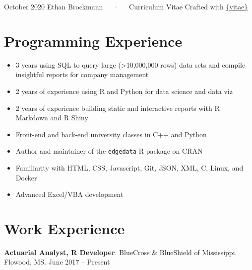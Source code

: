 \documentclass[11pt, a4paper]{awesome-cv}
\begin{document}
\makecvheader

\makecvfooter
  {October 2020}
    {Ethan Brockmann~~~·~~~Curriculum Vitae}
  {Crafted with \href{https://github.com/mitchelloharawild/vitae}{\{vitae\}}}




\hypertarget{programming-experience}{%
\section{Programming Experience}\label{programming-experience}}

\begin{itemize}
\item
  3 years using SQL to query large (\textgreater10,000,000 rows) data sets and compile insightful reports for company management
\item
  2 years of experience using R and Python for data science and data viz
\item
  2 years of experience building static and interactive reports with R Markdown and R Shiny
\item
  Front-end and back-end university classes in C++ and Python
\item
  Author and maintainer of the \texttt{edgedata} R package on CRAN
\item
  Familiarity with HTML, CSS, Javascript, Git, JSON, XML, C, Linux, and Docker
\item
  Advanced Excel/VBA development
\end{itemize}

\hypertarget{work-experience}{%
\section{Work Experience}\label{work-experience}}

\textbf{Actuarial Analyst, R Developer}. BlueCross \& BlueShield of Mississippi. Flowood, MS. June 2017 -- Present
\end{document}
